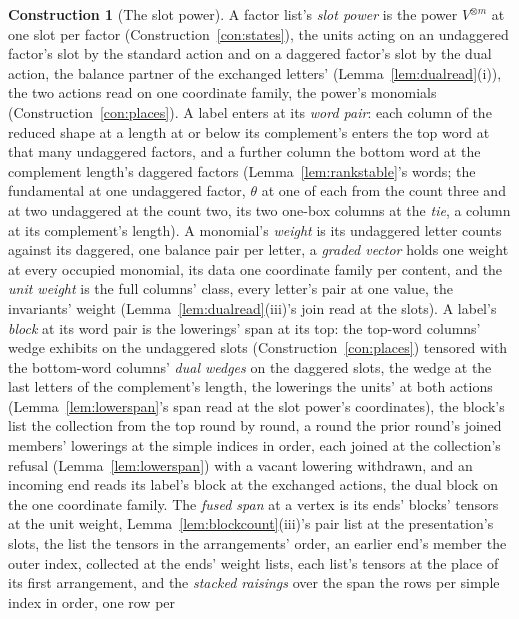 \documentclass[11pt]{article}
\theoremstyle{definition}
\newtheorem{construction}{Construction}
\begin{document}
\begin{construction}[The slot power]\label{con:slotpower}
A factor list's \emph{slot power} is the power $V^{\otimes m}$ at
one slot per factor (Construction~\ref{con:states}), the units
acting on an undaggered factor's slot by the standard action and on
a daggered factor's slot by the dual action, the balance partner of
the exchanged letters' (Lemma~\ref{lem:dualread}(i)), the two
actions read on one coordinate family, the power's monomials
(Construction~\ref{con:places}). A label enters at its \emph{word
pair}: each column of the reduced shape at a length at or below its
complement's enters the top word at that many undaggered factors,
and a further column the bottom word at the complement length's
daggered factors (Lemma~\ref{lem:rankstable}'s words; the
fundamental at one undaggered factor, $\theta$ at one of each from
the count three and at two undaggered at the count two, its two
one-box columns at the \emph{tie}, a column at its complement's
length). A monomial's \emph{weight} is its
undaggered letter counts against its daggered, one balance pair per
letter, a \emph{graded vector} holds one weight at every occupied
monomial, its data one coordinate family per content, and the
\emph{unit weight} is the full columns' class, every letter's pair
at one value, the invariants' weight (Lemma~\ref{lem:dualread}(iii)'s
join read at the slots). A label's \emph{block} at its word pair is the lowerings' span at
its top: the
top-word columns' wedge exhibits on the undaggered slots
(Construction~\ref{con:places}) tensored with the bottom-word
columns' \emph{dual wedges} on the daggered slots, the wedge at the
last letters of the complement's length, the lowerings the units'
at both actions (Lemma~\ref{lem:lowerspan}'s span read at the slot
power's coordinates), the block's list the collection from the top
round by round, a round the prior round's joined members'
lowerings at the simple indices in order, each joined at the
collection's refusal (Lemma~\ref{lem:lowerspan}) with a vacant
lowering withdrawn, and an incoming end reads its label's block
at the exchanged actions, the dual block on the one coordinate
family. The \emph{fused span} at a vertex is its ends' blocks'
tensors at the unit weight, Lemma~\ref{lem:blockcount}(iii)'s pair
list at the presentation's slots, the list the tensors in the
arrangements' order, an earlier end's member the outer index,
collected at the ends' weight lists, each list's tensors at the
place of its first arrangement, and the \emph{stacked raisings}
over the span the rows per simple index in order, one row per

\end{construction}
\end{document}
